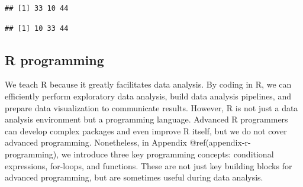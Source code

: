 \documentclass[
]{article}
\newenvironment{Shaded}{\begin{snugshade}}{\end{snugshade}}
\newcommand{\FunctionTok}[1]{\textcolor[rgb]{0.13,0.29,0.53}{\textbf{#1}}}
\newcommand{\NormalTok}[1]{#1}
\newcommand{\SpecialCharTok}[1]{\textcolor[rgb]{0.81,0.36,0.00}{\textbf{#1}}}
\newcommand{\StringTok}[1]{\textcolor[rgb]{0.31,0.60,0.02}{#1}}
\begin{document}
\begin{verbatim}
## [1] 33 10 44
\end{verbatim}

\begin{Shaded}
\end{Shaded}

\begin{verbatim}
## [1] 10 33 44
\end{verbatim}

\subsection{R programming}\label{r-programming}

We teach R because it greatly facilitates data analysis. By coding in R,
we can efficiently perform exploratory data analysis, build data
analysis pipelines, and prepare data visualization to communicate
results. However, R is not just a data analysis environment but a
programming language. Advanced R programmers can develop complex
packages and even improve R itself, but we do not cover advanced
programming. Nonetheless, in Appendix @ref(appendix-r-programming), we
introduce three key programming concepts: conditional expressions,
for-loops, and functions. These are not just key building blocks for
advanced programming, but are sometimes useful during data analysis.

\pagebreak
\end{document}
